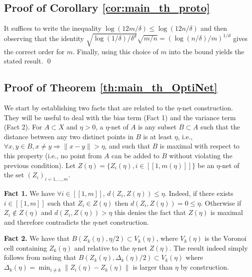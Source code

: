 \documentclass[paper=a4, fontsize=11pt]{scrartcl}
\begin{document}
\subsection*{Proof of Corollary \ref{cor:main_th_proto}}

It suffices to write the inequality \(\log(12m/\delta) \leq \log(12n/\delta)\) and then observing that the identity \(\sqrt{\log(1/\delta)/\delta^d} \sqrt{m/n} = (\log(n/\delta)/m)^{1/d}\) gives the correct order for $m$. Finally, using this choice of $m$ into the bound yields the stated result.
\qed

\subsection*{Proof of Theorem \ref{th:main_th_OptiNet}}

We start by establishing two facts that are related to the $\eta$-net construction. They will be useful to deal with the bias term (Fact 1) and the variance term (Fact 2). For \( A \subset X \) and \( \eta > 0 \), a \( \eta \)-net of \( A \) is any subset \( B \subset A \) such that the distance between any two distinct points in \( B \) is at least \( \eta \), i.e., \( \forall x, y \in B, x \neq y \Rightarrow \|x - y\| > \eta \),  and such that \( B \) is maximal with respect to this property (i.e., no point from \( A \) can be added to \( B \) without violating the previous condition). 
Let $Z(\eta) = \{ Z_i(\eta), i \in [\![1,m(\eta)]\!] \}$ be an $\eta$-net of the set $(Z_i)_{i=1,\dots,m}$. 

\noindent \textbf{Fact 1.} 
We have $\forall i \in [\![1,m]\!], \, d(Z_i, Z(\eta)) \leq \eta$. Indeed, if there exists $i \in [\![1,m]\! ]$ such that $Z_i \in Z(\eta)$ then $d(Z_i, Z(\eta)) = 0 \leq \eta$. Otherwise if $Z_i \notin Z(\eta)$ and $d(Z_i, Z(\eta)) > \eta$ this denies the fact that $Z(\eta)$ is maximal and therefore contradicts the $\eta$-net construction.

\noindent \textbf{Fact 2.} We have that $ B ( Z_k (\eta), \eta /2)  \subset V_k(\eta)$, where $V_k(\eta)$ is the Voronoi cell containing $Z_k(\eta)$ and relative to the $\eta$-net $Z(\eta)$. The result indeed simply follows from noting that
 $ B ( Z_k (\eta) , \Delta_k (\eta) /2) \subset  V_k (\eta)      $ where $\Delta _k(\eta)  = \min _{i\neq k} \|Z_i(\eta) - Z_k(\eta) \| $ is larger than $\eta $ by construction. 
\end{document}
